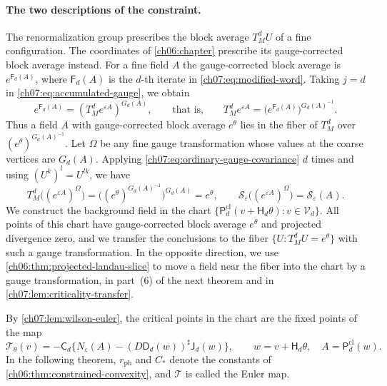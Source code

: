 \paragraph{The two descriptions of the constraint.}
The renormalization group prescribes the block average $T_M^dU$ of a fine configuration. The coordinates of \cref{ch06:chapter} prescribe its gauge-corrected block average instead. For a fine field $A$ the gauge-corrected block average is $e^{\mathsf F_d(A)}$, where $\mathsf F_d(A)$ is the $d$-th iterate in \eqref{ch07:eq:modified-word}. Taking $j=d$ in \eqref{ch07:eq:accumulated-gauge}, we obtain
\[
 e^{\mathsf F_d(A)}=(T_M^de^{\varepsilon A})^{G_d(A)},\qquad\text{that is,}\qquad
 T_M^de^{\varepsilon A}=\bigl(e^{\mathsf F_d(A)}\bigr)^{G_d(A)^{-1}}.
\]
Thus a field $A$ with gauge-corrected block average $e^\theta$ lies in the fiber of $T_M^d$ over $(e^\theta)^{G_d(A)^{-1}}$. Let $\Omega$ be any fine gauge transformation whose values at the coarse vertices are $G_d(A)$. Applying \eqref{ch07:eq:ordinary-gauge-covariance} $d$ times and using $(U^k)^l=U^{lk}$, we have
\[
 T_M^d\bigl((e^{\varepsilon A})^\Omega\bigr)=\bigl((e^\theta)^{G_d(A)^{-1}}\bigr)^{G_d(A)}=e^\theta,\qquad
 \mathscr S_\varepsilon\bigl((e^{\varepsilon A})^\Omega\bigr)=\mathscr S_\varepsilon(A).
\]
We construct the background field in the chart $\{\mathsf P_d^{\mathrm{cl}}(v+\mathsf H_d\theta):v\in\mathcal V_d\}$. All points of this chart have gauge-corrected block average $e^\theta$ and projected divergence zero, and we transfer the conclusions to the fiber $\{U:T_M^dU=e^\theta\}$ with such a gauge transformation. In the opposite direction, we use \cref{ch06:thm:projected-landau-slice} to move a field near the fiber into the chart by a gauge transformation, in part~(6) of the next theorem and in \cref{ch07:lem:criticality-transfer}.

By \cref{ch07:lem:wilson-euler}, the critical points in the chart are the fixed points of the map
\[
 \mathcal T_\theta(v)=-\mathsf C_d\bigl\{N_\varepsilon(A)-(D\mathsf D_d(w))^\sharp\mathsf J_d(w)\bigr\},\qquad w=v+\mathsf H_d\theta,\quad A=\mathsf P_d^{\mathrm{cl}}(w).
\]
In the following theorem, $r_{\mathrm{ph}}$ and $C_*$ denote the constants of \cref{ch06:thm:constrained-convexity}, and $\mathcal T$ is called the Euler map.

